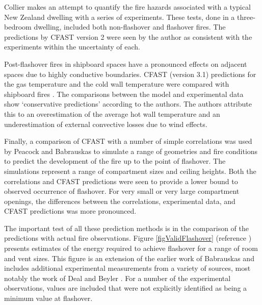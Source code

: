 Collier \cite{Valid:Collier} makes an attempt to quantify the fire hazards associated with a typical New Zealand dwelling with a series of experiments. These tests, done in a three-bedroom dwelling, included both non-flashover and flashover fires. The predictions by CFAST version 2 were seen by the author as consistent with the experiments within the uncertainty of each.

Post-flashover fires in shipboard spaces have a pronounced effects on adjacent spaces due to highly conductive boundaries. CFAST (version 3.1) predictions for the gas temperature and the cold wall temperature were compared with shipboard fires \cite{Valid:White}. The comparisons between the model and experimental data show `conservative predictions' according to the authors. The authors attribute this to an overestimation of the average hot wall temperature and an underestimation of external convective losses due to wind effects.

Finally, a comparison of CFAST with a number of simple correlations was used by Peacock and Babrauskas \cite{Valid:Peacock_Flashover_1,Valid:Peacock_Flashover_2} to simulate a range of geometries and fire conditions to predict the development of the fire up to the point of flashover. The simulations represent a range of compartment sizes and ceiling heights. Both the correlations and CFAST predictions were seen to provide a lower bound to observed occurrence of flashover. For very small or very large compartment openings, the differences between the correlations, experimental data, and CFAST predictions was more pronounced.

The important test of all these prediction methods is in the comparison of the predictions with actual fire observations. Figure \ref{figValidFlashover} (reference \cite{Valid:Peacock_Flashover_2}) presents estimates of the energy required to achieve flashover for a range of room and vent sizes. This figure is an extension of the earlier work of Babrauskas  \cite{Valid:Babrauskas_Flashover} and includes additional experimental measurements from a variety of sources, most notably the work of Deal and Beyler \cite{Valid:DealandBeyler}. For a number of the experimental observations, values are included that were not explicitly identified as being a minimum value at flashover.


